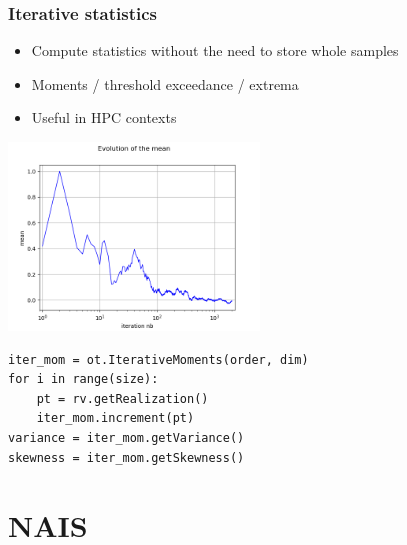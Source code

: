 \documentclass{beamer}
\begin{document}

\begin{frame}[containsverbatim]
\frametitle{Iterative statistics}

\begin{itemize}
\item Compute statistics without the need to store whole samples
\item Moments / threshold exceedance / extrema
\item Useful in HPC contexts
\end{itemize}

\begin{center}
\includegraphics[width=0.5\textwidth]{figures/sphx_glr_plot_iterative_moments_001.png}
\end{center}

\begin{lstlisting}
iter_mom = ot.IterativeMoments(order, dim)
for i in range(size):
    pt = rv.getRealization()
    iter_mom.increment(pt)
variance = iter_mom.getVariance()
skewness = iter_mom.getSkewness()
\end{lstlisting}


\end{frame}


\section{NAIS}

\end{document}

